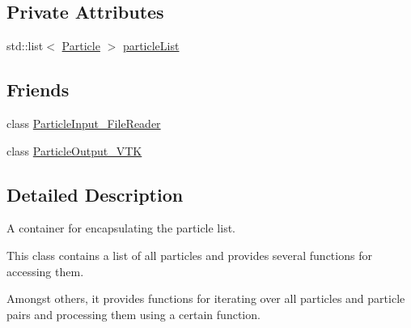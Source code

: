 \subsection*{Private Attributes}
\begin{DoxyCompactItemize}
\item 
std\-::list$<$ \hyperlink{classParticle}{Particle} $>$ \hyperlink{classParticleContainer_a037012a8f2e872258702209261d8f10e}{particle\-List}
\end{DoxyCompactItemize}
\subsection*{Friends}
\begin{DoxyCompactItemize}
\item 
class \hyperlink{classParticleContainer_a7c0d8a2d97fdcd7711b15cc13e5b31c9}{Particle\-Input\-\_\-\-File\-Reader}
\item 
class \hyperlink{classParticleContainer_a90fad3b5eb61cdccf67f618b72f5a767}{Particle\-Output\-\_\-\-V\-T\-K}
\end{DoxyCompactItemize}


\subsection{Detailed Description}
A container for encapsulating the particle list. 

This class contains a list of all particles and provides several functions for accessing them.

Amongst others, it provides functions for iterating over all particles and particle pairs and processing them using a certain function. 


